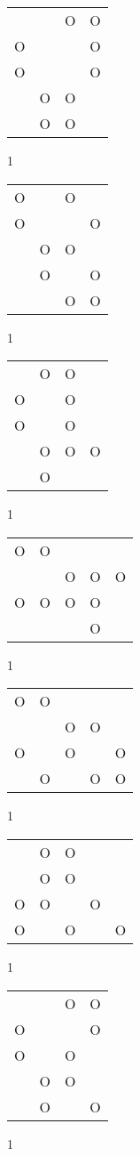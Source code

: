 \begin{tabular}{|m{0.2cm}m{0.2cm}m{0.2cm}m{0.2cm}|}\hline
 & &O&O\\
O& & &O\\
O& & &O\\
 &O&O& \\
 &O&O& \\
\hline\end{tabular}1
\begin{tabular}{|m{0.2cm}m{0.2cm}m{0.2cm}m{0.2cm}|}\hline
O& &O& \\
O& & &O\\
 &O&O& \\
 &O& &O\\
 & &O&O\\
\hline\end{tabular}1
\begin{tabular}{|m{0.2cm}m{0.2cm}m{0.2cm}m{0.2cm}|}\hline
 &O&O& \\
O& &O& \\
O& &O& \\
 &O&O&O\\
 &O& & \\
\hline\end{tabular}1
\begin{tabular}{|m{0.2cm}m{0.2cm}m{0.2cm}m{0.2cm}m{0.2cm}|}\hline
O&O& & & \\
 & &O&O&O\\
O&O&O&O& \\
 & & &O& \\
\hline\end{tabular}1
\begin{tabular}{|m{0.2cm}m{0.2cm}m{0.2cm}m{0.2cm}m{0.2cm}|}\hline
O&O& & & \\
 & &O&O& \\
O& &O& &O\\
 &O& &O&O\\
\hline\end{tabular}1
\begin{tabular}{|m{0.2cm}m{0.2cm}m{0.2cm}m{0.2cm}m{0.2cm}|}\hline
 &O&O& & \\
 &O&O& & \\
O&O& &O& \\
O& &O& &O\\
\hline\end{tabular}1
\begin{tabular}{|m{0.2cm}m{0.2cm}m{0.2cm}m{0.2cm}|}\hline
 & &O&O\\
O& & &O\\
O& &O& \\
 &O&O& \\
 &O& &O\\
\hline\end{tabular}1
